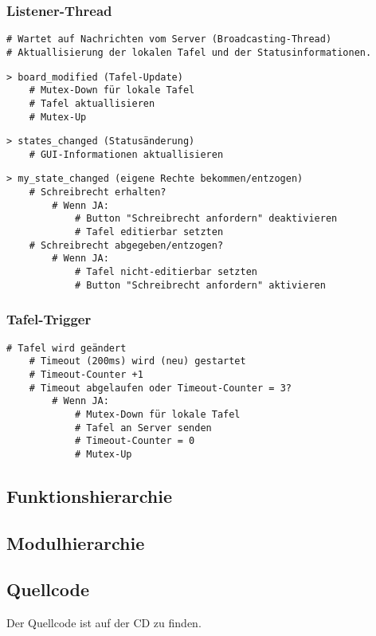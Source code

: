\subsubsection{Listener-Thread}
\begin{lstlisting}
# Wartet auf Nachrichten vom Server (Broadcasting-Thread)
# Aktuallisierung der lokalen Tafel und der Statusinformationen.
\end{lstlisting}
\begin{lstlisting}
> board_modified (Tafel-Update)
    # Mutex-Down für lokale Tafel
    # Tafel aktuallisieren
    # Mutex-Up
\end{lstlisting}
\begin{lstlisting}
> states_changed (Statusänderung)
    # GUI-Informationen aktuallisieren
\end{lstlisting}
\begin{lstlisting}
> my_state_changed (eigene Rechte bekommen/entzogen)
    # Schreibrecht erhalten?
        # Wenn JA:
            # Button "Schreibrecht anfordern" deaktivieren
            # Tafel editierbar setzten
    # Schreibrecht abgegeben/entzogen?
        # Wenn JA:
            # Tafel nicht-editierbar setzten
            # Button "Schreibrecht anfordern" aktivieren
\end{lstlisting}

\subsubsection{Tafel-Trigger}
\begin{lstlisting}
# Tafel wird geändert
    # Timeout (200ms) wird (neu) gestartet
    # Timeout-Counter +1
    # Timeout abgelaufen oder Timeout-Counter = 3?
        # Wenn JA:
            # Mutex-Down für lokale Tafel
            # Tafel an Server senden
            # Timeout-Counter = 0
            # Mutex-Up
\end{lstlisting}

\subsection{Funktionshierarchie}

\subsection{Modulhierarchie}

\subsection{Quellcode}
Der Quellcode ist auf der CD zu finden.